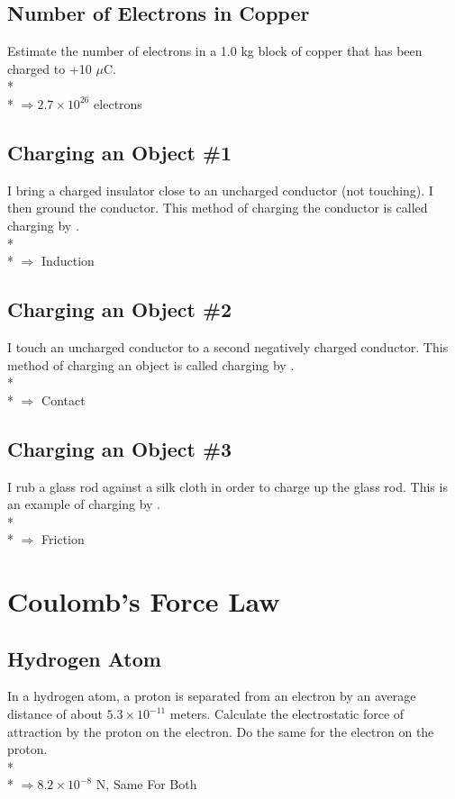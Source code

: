 \documentclass[11pt]{article}
\begin{document}
\subsection{Number of Electrons in Copper}
Estimate the number of electrons in a 1.0 kg block of copper that has been charged to +10 $\mu$C. \\* \\*
$\Rightarrow 2.7 \times 10^{26}$ electrons

\subsection{Charging an Object \#1}
I bring a charged insulator close to an uncharged conductor (not touching).  I then ground the conductor.  This method of charging the conductor is called charging by \underline{\hspace{1cm}}. \\* \\*
$\Rightarrow$ Induction

\subsection{Charging an Object \#2}
I touch an uncharged conductor to a second negatively charged conductor.  This method of charging an object is called charging by \underline{\hspace{1cm}}. \\* \\*
$\Rightarrow$ Contact

\subsection{Charging an Object \#3}
I rub a glass rod against a silk cloth in order to charge up the glass rod.  This is an example of charging by \underline{\hspace{1cm}}. \\* \\*
$\Rightarrow$ Friction


\pagebreak
\section{Coulomb's Force Law}
\vspace{10pt}

\subsection{Hydrogen Atom}
In a hydrogen atom, a proton is separated from an electron by an average distance of about $5.3 \times 10^{-11}$ meters.  Calculate the electrostatic force of attraction by the proton on the electron.  Do the same for the electron on the proton. \\* \\*
$\Rightarrow 8.2 \times 10^{-8}$ N, Same For Both
\end{document}
